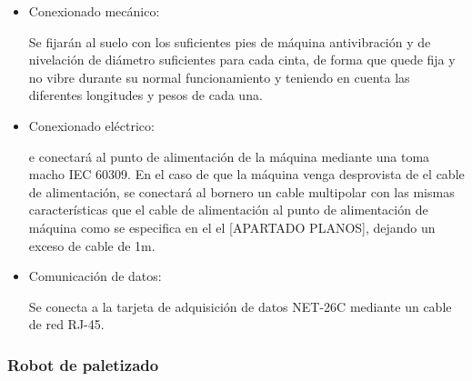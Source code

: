 		\begin{itemize}
				\item{Conexionado mecánico:}
				
				Se fijarán al suelo con los suficientes pies de máquina antivibración y de nivelación de diámetro suficientes para cada cinta, de forma que quede fija y no vibre durante su normal funcionamiento y teniendo en cuenta las diferentes longitudes y pesos de cada una.

				\item{Conexionado eléctrico:}

				e conectará al punto de alimentación de la máquina mediante una  toma macho IEC 60309. En el caso de que la máquina venga desprovista de el cable de alimentación, se conectará al bornero un cable multipolar con las mismas características que el cable de alimentación al punto de alimentación de máquina como se especifica en el el [APARTADO PLANOS], dejando un exceso de cable de 1m. \ 
				
				\item{Comunicación de datos:}

				Se conecta a la tarjeta de adquisición de datos NET-26C mediante un cable de red RJ-45.
		\end{itemize}


\newpage

\subsubsection{Robot de paletizado}

	
	
